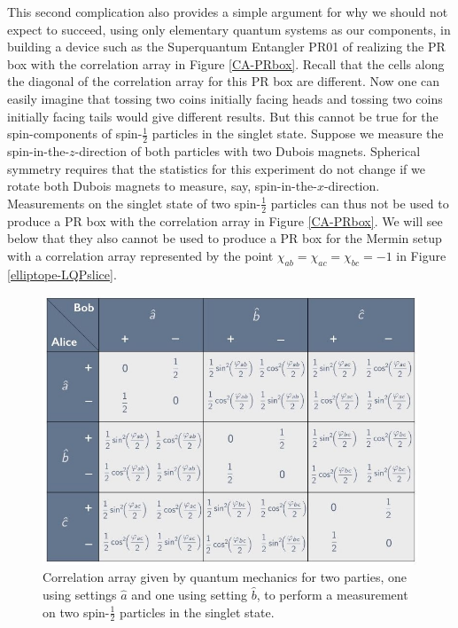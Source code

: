 This second complication also provides a simple argument for why we should not expect to succeed, using only elementary quantum systems as our components, in building a device such as the Superquantum Entangler PR01 of \citet{Bub and Bub 2018} realizing the PR box with the correlation array in Figure \ref{CA-PRbox}. Recall that the cells along the diagonal of the correlation array for this PR box are different. Now one can easily imagine that tossing two coins initially facing heads and tossing two coins initially facing tails would give different results. But this cannot be true for the spin-components of spin-$\frac12$ particles in the singlet state. Suppose we measure the spin-in-the-$z$-direction of both particles with two Dubois magnets. Spherical symmetry requires that the statistics for this experiment do not change if we rotate both Dubois magnets to measure, say, spin-in-the-$x$-direction. Measurements on the singlet state of two spin-$\frac12$ particles can thus not be used to produce a PR box with the correlation array in Figure \ref{CA-PRbox}. We will see below that they also cannot be used to produce a PR box for the Mermin setup with a correlation array represented by the point $\chi_{ab} = \chi_{ac} = \chi_{bc} = -1$ in Figure \ref{elliptope-LQPslice}.

\begin{figure}[h]
 \centering
   \includegraphics[width=5.5in]{CA-3set2out-non-signaling-halfangles.jpeg} 
   \caption{Correlation array given by quantum mechanics for two parties, one using settings $\hat{a}$ and one using setting $\hat{b}$, to perform a measurement on two spin-$\frac12$ particles in the singlet state.}
   \label{CA-3set2out-non-signaling-halfangles}
\end{figure}

